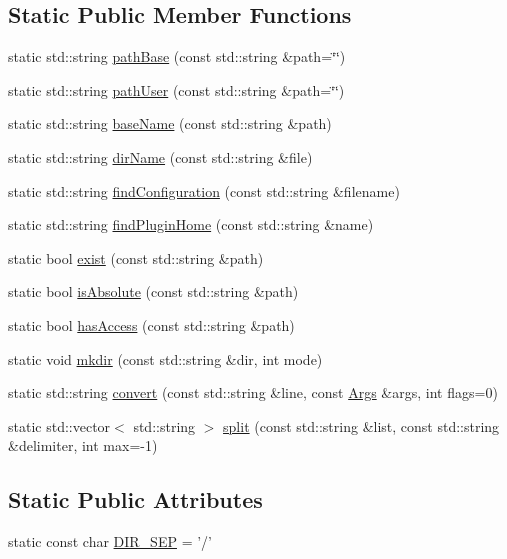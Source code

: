 \subsection*{Static Public Member Functions}
\begin{DoxyCompactItemize}
\item 
static std\-::string \hyperlink{a00069_ae9394c5a6ee2ca9e81e4b9ab2f1bb9a1}{path\-Base} (const std\-::string \&path=\char`\"{}\char`\"{})
\item 
static std\-::string \hyperlink{a00069_a19782d9c48631d19da4977b219a2fcfa}{path\-User} (const std\-::string \&path=\char`\"{}\char`\"{})
\item 
static std\-::string \hyperlink{a00069_a92d3e6f2e055856ebc51b7b30e6f324f}{base\-Name} (const std\-::string \&path)
\item 
static std\-::string \hyperlink{a00069_ac78b462e384deb39dbb9dd8144f38cf5}{dir\-Name} (const std\-::string \&file)
\item 
static std\-::string \hyperlink{a00069_ae6309779e43fed6b4f2cf75b8df9452d}{find\-Configuration} (const std\-::string \&filename)
\item 
static std\-::string \hyperlink{a00069_a4535320f210acf44bddf1380b5c26216}{find\-Plugin\-Home} (const std\-::string \&name)
\item 
static bool \hyperlink{a00069_a554029923946ed5bf0650364f9bb3e81}{exist} (const std\-::string \&path)
\item 
static bool \hyperlink{a00069_a0131a213d1089adaaa26e340d45a8270}{is\-Absolute} (const std\-::string \&path)
\item 
static bool \hyperlink{a00069_a6854d1ab098f98d36358b4d7207b7918}{has\-Access} (const std\-::string \&path)
\item 
static void \hyperlink{a00069_af44ad5c0d2321f653081721d20af211a}{mkdir} (const std\-::string \&dir, int mode)
\item 
static std\-::string \hyperlink{a00069_a9214eb255c16d84fd26752530e2b5e94}{convert} (const std\-::string \&line, const \hyperlink{a00002}{Args} \&args, int flags=0)
\item 
static std\-::vector$<$ std\-::string $>$ \hyperlink{a00069_aea1fecebd7bebc1521a8ad589f7a9bfe}{split} (const std\-::string \&list, const std\-::string \&delimiter, int max=-\/1)
\end{DoxyCompactItemize}
\subsection*{Static Public Attributes}
\begin{DoxyCompactItemize}
\item 
static const char \hyperlink{a00069_a51e7d388e9c586ead4e893cb5d3defed}{D\-I\-R\-\_\-\-S\-E\-P} = '/'
\end{DoxyCompactItemize}


